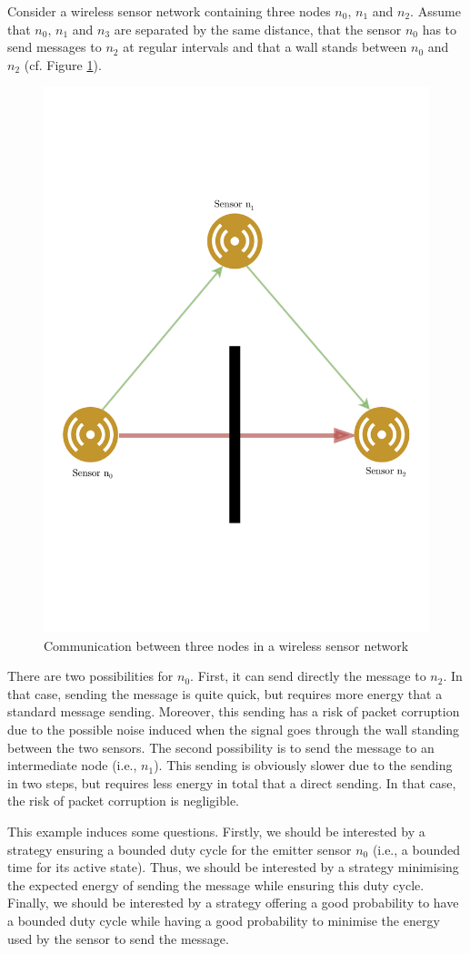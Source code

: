 \begin{example}\label{main-example}
Consider a wireless sensor network containing three nodes $n_0,\, n_1$ and $n_2$. Assume that $n_0, \, n_1$ and $n_3$ are separated by the same distance, that the sensor $n_0$ has to send messages to $n_2$ at regular intervals and that a wall stands between $n_0$ and $n_2$ (cf. Figure \ref{sensor_net}).
\begin{figure}[h!]
  \centering
  \includegraphics[width=0.7\linewidth]{resources/example3}
  \caption{Communication between three nodes in a wireless sensor network} \label{sensor_net}
\end{figure}
There are two possibilities for $n_0$. First, it can send directly the message to $n_2$. In that case, sending the message is quite quick, but requires more energy that a standard message sending. %
Moreover, this sending has a risk of packet corruption due to the possible noise induced when the signal goes through the wall standing between the two sensors.
The second possibility is to send the message to an intermediate node (i.e., $n_1$). This sending is obviously slower due to the sending in two steps, but requires less energy in total that a direct sending.
In that case, the risk of packet corruption is negligible. \par
This example induces some questions. Firstly, we should be interested by a strategy ensuring a bounded duty cycle for the emitter sensor $n_0$ (i.e., a bounded time for its active state).
Thus, we should be interested by a strategy minimising the expected energy of sending the message while ensuring this duty cycle.
Finally, we should be interested by a strategy offering a good probability to have a bounded duty cycle while having a good probability to minimise the energy used by the sensor to send the message.
\end{example}
